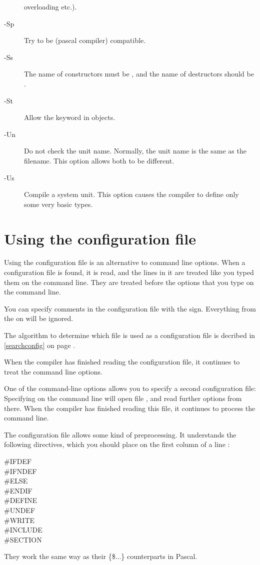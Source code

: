 \documentclass{report}
\begin{document}
\begin{description}
overloading etc.).
\item [-Sp]  Try to be  (\gnu pascal compiler)
compatible.
\item [-Ss]  The name of constructors must be , and the
name of destructors should be .
\item [-St]  Allow the  keyword in objects.
\item [-Un]  Do not check the unit name. Normally, the unit name
is the same as the filename. This option allows both to be different.
\item [-Us]  Compile a system unit. This option causes the
compiler to define only some very basic types.
\end{description}


\section{Using the configuration file}
\label{se:configfile}
Using the configuration file  is an alternative to command
line options. When a configuration file is found, it is read, and the lines
in it are treated like you typed them on the command line. They are treated
before the options that you type on the command line.

You can specify comments in the configuration file with the \var{\#} sign.
Everything from the \var{\#} on will be ignored.

The algorithm to determine which file is used as a configuration file
is decribed in \ref{searchconfig} on page \pageref{searchconfig}.

When the compiler has finished reading the configuration file, it continues
to treat the command line options.

One of the command-line options allows you to specify a second configuration
file: Specifying  on the command line will open file ,
and read further options from there. When the compiler has finished reading
this file, it continues to process the command line.

The configuration file allows some kind of preprocessing. It understands the
following directives, which you should place on the first column of a line :
\begin{description}
\item [\#IFDEF]
\item [\#IFNDEF]
\item [\#ELSE]
\item [\#ENDIF]
\item [\#DEFINE]
\item [\#UNDEF]
\item [\#WRITE]
\item [\#INCLUDE]
\item [\#SECTION]
\end{description}
They work the same way as their \{\$...\}  counterparts in Pascal.
\end{document}
